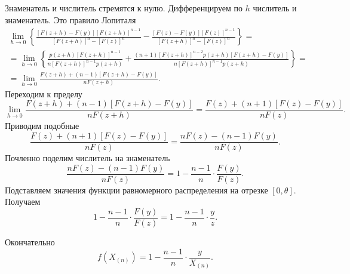 Знаменатель и числитель стремятся к нулю.
Дифференцируем по $h$ числитель и знаменатель.
Это правило Лопиталя
\begin{equation*}
  \begin{split}
    \lim \limits_{h \to 0} \left\{
      \frac{ \left[ F \left( z + h \right) - F \left( y \right) \right] \left[ F \left( z + h \right) \right]^{n - 1}}{ \left[ F \left( z + h \right) \right]^n - \left[ F \left( z \right) \right]^n} -
      \frac{ \left[ F \left( z \right) - F \left( y \right) \right] \left[ F \left( z \right) \right]^{n - 1}}{ \left[ F \left( z + h \right) \right]^n - \left[ F \left( z \right) \right]^n}
    \right\} = \\
    = \lim \limits_{h \to 0} \left\{
      \frac{p \left( z + h \right) \left[ F \left( z + h \right) \right]^{n - 1}}{n \left[ F \left( z + h \right) \right]^{n - 1} p \left( z + h \right) } +
      \frac{ \left( n + 1 \right) \left[ F \left( z + h \right) \right]^{n - 2} p \left( z + h \right) \left[ F \left( z + h \right) - F \left( y \right) \right] }{n \left[ F \left( z + h \right) \right]^{n - 1} p \left( z + h \right) }
    \right\} = \\
    = \lim \limits_{h \to 0}
      \frac{F \left( z + h \right) + \left( n - 1 \right) \left[ F \left( z + h \right) - F \left( y \right) \right] }{nF \left( z + h \right) }.
  \end{split}
\end{equation*}
Переходим к пределу
$$ \lim \limits_{h \to 0}
    \frac{F \left( z + h \right) + \left( n - 1 \right) \left[ F \left( z + h \right) - F \left( y \right) \right] }{nF \left( z + h \right) } =
  \frac{F \left( z \right) + \left( n + 1 \right) \left[ F \left( z \right) - F \left( y \right) \right] }{nF \left( z \right) }.$$
Приводим подобные
$$ \frac{F \left( z \right) + \left( n + 1 \right) \left[ F \left( z \right) - F \left( y \right) \right] }{nF \left( z \right) } =
  \frac{nF \left( z \right) - \left( n - 1 \right) F \left( y \right) }{nF \left( z \right) }.$$
Почленно поделим числитель на знаменатель
$$ \frac{nF \left( z \right) - \left( n - 1 \right) F \left( y \right) }{nF \left( z \right) } =
  1 - \frac{n - 1}{n} \cdot \frac{F \left( y \right) }{F \left( z \right) }.$$
Подставляем значения функции равномерного распределения на отрезке $ \left[ 0, \theta \right] $.
Получаем
$$1 - \frac{n - 1}{n} \cdot \frac{F \left( y \right) }{F \left( z \right) } =
  1 - \frac{n - 1}{n} \cdot \frac{y}{z}.$$

Окончательно
$$f \left( X_{ \left( n \right) } \right) =
  1 - \frac{n - 1}{n} \cdot \frac{y}{X_{ \left( n \right) }}.$$

